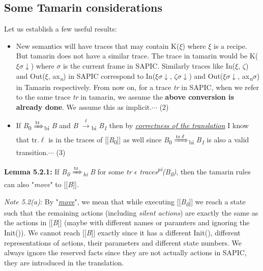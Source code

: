 \documentclass[11pt]{article}
\begin{document}
\subsection{Some Tamarin considerations}
\vspace{8pt}
Let us establish a few useful results:
\begin{itemize}
  \item New semantics will have traces that may contain K($\xi$) where $\xi$ is a recipe. But tamarin does not have a similar trace. The trace in tamarin would be K($\xi$$\sigma$$\downarrow$) where $\sigma$ is the current frame in SAPIC. Similarly traces like In($\xi$, $\zeta$) and Out($\xi$, ax\textsubscript{{\it n}}) in SAPIC correspond to In($\xi$$\sigma$$\downarrow$, $\zeta$$\sigma$$\downarrow$) and Out($\xi$$\sigma$$\downarrow$, ax\textsubscript{{\it n}}$\sigma$) in Tamarin respectively. From now on, for a trace {\it tr} in SAPIC, when we refer to the same trace {\it tr} in tamarin, we assume the {\bf above conversion is already done}. We assume this as implicit.\hfill \hfill $\cdots$ (2)

  \item If {\it B}\textsubscript{0} {$\xRightarrow[\text{}]{\text{tr}}$}\textsubscript{bi} {\it B} and {\it B} {$\xrightarrow[\text{}]{\text{$\ell$}}$}{\textsubscript{bi}} {\it B\textsubscript{1}} then by \underline{{\it correctness of the translation}} I know that tr.$\ell$ is in the traces of [[{\it B}\textsubscript{0}]] as well since {\it B}\textsubscript{0} {$\xRightarrow[\text{}]{\text{tr.$\ell$}}$}\textsubscript{bi} {\it B\textsubscript{1}} is also a valid transition.\hfill \hfill $\cdots$ (3)\newline

\end{itemize}  

{\bf Lemma 5.2.1: }If {\it B\textsubscript{0} {$\xRightarrow[\text{}]{\text{tr}}$}\textsubscript{bi} B} for some {\it tr $\epsilon$ traces\textsuperscript{pi}(B\textsubscript{0})}, then the tamarin rules can also \hspace*{100pt} "{\it move}" to [[{\it B}]]. \newline

{\it Note 5.2(a):} By "\underline{{\it move}}", we mean that while executing [[{\it B\textsubscript{0}}]] we reach a state such that the remaining actions (including {\it silent actions}) are exactly the same as the actions in [[{\it B}]] (maybe with different names or paramters and ignoring the Init()). We cannot reach [[{\it B}]] exactly since it has a different Init(), different representations of actions, their parameters and different state numbers. We always ignore the reserved facts since they are not actually actions in SAPIC, they are introduced in the translation.
\end{document}
